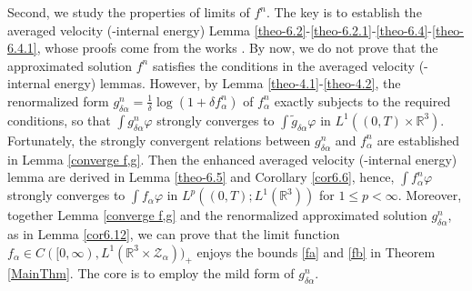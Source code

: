 \documentclass[reqno,11pt]{amsart}
\numberwithin{equation}{section}
\def\R{\mathbb{R}}
\begin{document}
Second, we study the properties of limits of $f^n$. The key is to establish the averaged velocity (-internal energy) Lemma \ref{theo-6.2}-\ref{theo-6.2.1}-\ref{theo-6.4}-\ref{theo-6.4.1}, whose proofs come from the works \cite{Diperna-Lions,Golse-velocity,Golse-perthame-velocity}. By now, we do not prove that the approximated solution $f^n$ satisfies the conditions in the averaged velocity (-internal energy) lemmas. However, by Lemma \ref{theo-4.1}-\ref{theo-4.2}, the renormalized form $g^n_{\delta \alpha} = \frac{1}{\delta} \log (1 + \delta f^n_\alpha)$ of $f^n_\alpha$ exactly subjects to the required conditions, so that $ \int g^n_{\delta \alpha} \varphi $ strongly converges to $\int \tilde{g}_{\delta \alpha} \varphi$ in $L^1 ((0, T) \times \R^3)$. Fortunately, the strongly convergent relations between $ g^n_{\delta \alpha} $ and $f^n_\alpha$ are established in Lemma \ref{converge f,g}. Then the enhanced averaged velocity (-internal energy) lemma are derived in Lemma \ref{theo-6.5} and Corollary \ref{cor6.6}, hence, $\int f^n_\alpha \varphi$ strongly converges to $\int f_\alpha \varphi$ in $L^p ( (0, T); L^1 (\R^3) )$ for $1 \leq p < \infty$. Moreover, together Lemma \ref{converge f,g} and the renormalized approximated solution $g^n_{\delta \alpha}$, as in Lemma \ref{cor6.12}, we can prove that the limit function $f_\alpha \in C([0,\infty), L^1 (\R^3 \times \mathcal{Z}_\alpha))_+$ enjoys the bounds \eqref{fa} and \eqref{fb} in Theorem \ref{MainThm}. The core is to employ the mild form of $g^n_{\delta \alpha}$.
\end{document}
